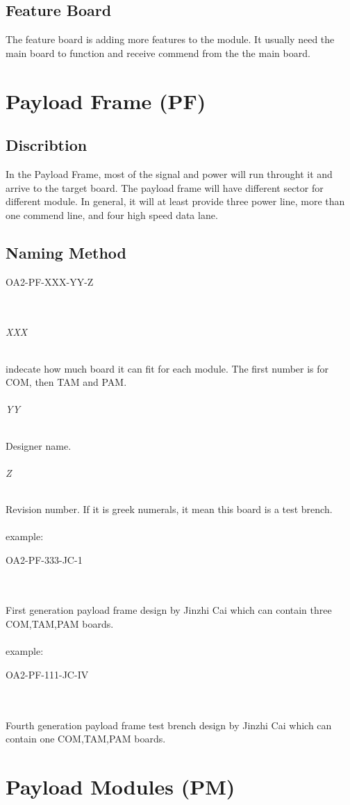\documentclass[12pt,article]{memoir}
\begin{document}
\section{Feature Board}%
The feature board is adding more features to the module. It usually need the main board to function and receive commend from the the main board.
\newpage
\chapter{Payload Frame (PF)}
\section{Discribtion}
In the Payload Frame, most of the signal and power will run throught it and arrive to the target board. The payload frame will have different sector for different module. In general, it will at least provide three power line, more than one commend line, and four high speed data lane.
\section{Naming Method}
\begin{LARGE}
OA2-PF-XXX-YY-Z
\end{LARGE}\\
\subparagraph{XXX}
indecate how much board it can fit for each module. The first number is for COM, then TAM and PAM.
\subparagraph{YY}
Designer name.
\subparagraph{Z}
Revision number. If it is greek numerals, it mean this board is a test brench.
\\\\
example: 
\begin{large}
OA2-PF-333-JC-1
\end{large}\\\\
First generation payload frame design by Jinzhi Cai which can contain three COM,TAM,PAM boards.\\\\
example: 
\begin{large}
OA2-PF-111-JC-IV
\end{large}\\\\
Fourth generation payload frame test brench design by Jinzhi Cai which can contain one COM,TAM,PAM boards.
\newpage
\chapter{Payload Modules (PM)}
\end{document}
